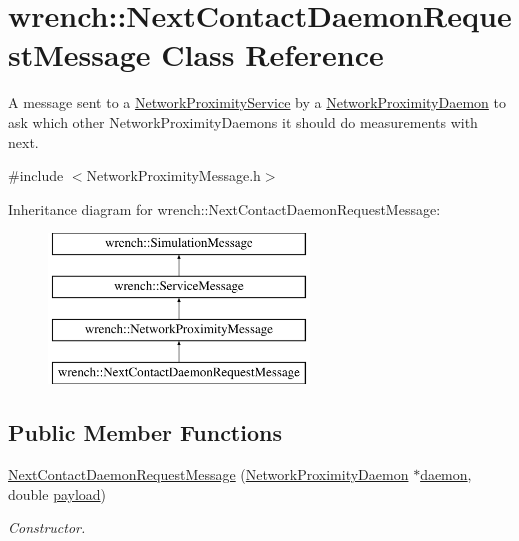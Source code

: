 \hypertarget{classwrench_1_1_next_contact_daemon_request_message}{}\section{wrench\+:\+:Next\+Contact\+Daemon\+Request\+Message Class Reference}
\label{classwrench_1_1_next_contact_daemon_request_message}


A message sent to a \hyperlink{classwrench_1_1_network_proximity_service}{Network\+Proximity\+Service} by a \hyperlink{classwrench_1_1_network_proximity_daemon}{Network\+Proximity\+Daemon} to ask which other Network\+Proximity\+Daemons it should do measurements with next.  




{\ttfamily \#include $<$Network\+Proximity\+Message.\+h$>$}

Inheritance diagram for wrench\+:\+:Next\+Contact\+Daemon\+Request\+Message\+:\begin{figure}[H]
\begin{center}
\leavevmode
\includegraphics[height=4.000000cm]{classwrench_1_1_next_contact_daemon_request_message}
\end{center}
\end{figure}
\subsection*{Public Member Functions}
\begin{DoxyCompactItemize}
\item 
\hyperlink{classwrench_1_1_next_contact_daemon_request_message_ae99d16d68b286d0087d500e60787f14d}{Next\+Contact\+Daemon\+Request\+Message} (\hyperlink{classwrench_1_1_network_proximity_daemon}{Network\+Proximity\+Daemon} $\ast$\hyperlink{classwrench_1_1_next_contact_daemon_request_message_ab6e503da009587d35cacb17a8cf03700}{daemon}, double \hyperlink{classwrench_1_1_simulation_message_a914f2732713f7c02898e66f05a7cb8a1}{payload})
\begin{DoxyCompactList}\small\item\em Constructor. \end{DoxyCompactList}\end{DoxyCompactItemize}
